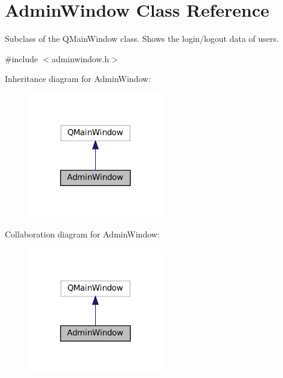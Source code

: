 \hypertarget{classAdminWindow}{}\section{Admin\+Window Class Reference}
\label{classAdminWindow}


Subclass of the Q\+Main\+Window class. Shows the login/logout data of users.  




{\ttfamily \#include $<$adminwindow.\+h$>$}



Inheritance diagram for Admin\+Window\+:\nopagebreak
\begin{figure}[H]
\begin{center}
\leavevmode
\includegraphics[width=167pt]{classAdminWindow__inherit__graph}
\end{center}
\end{figure}


Collaboration diagram for Admin\+Window\+:\nopagebreak
\begin{figure}[H]
\begin{center}
\leavevmode
\includegraphics[width=167pt]{classAdminWindow__coll__graph}
\end{center}
\end{figure}
